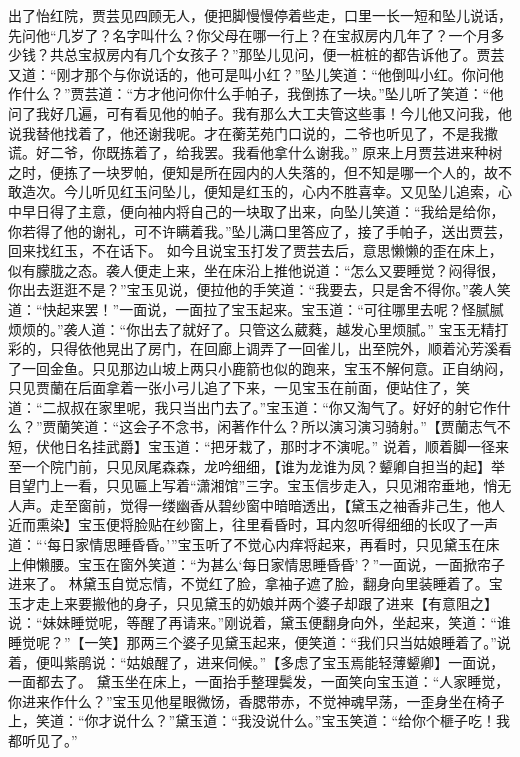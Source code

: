 \documentclass[12pt,oneside]{book}
\begin{document}
出了怡红院，贾芸见四顾无人，便把脚慢慢停着些走，口里一长一短和坠儿说话，先问他“几岁了？名字叫什么？你父母在哪一行上？在宝叔房内几年了？一个月多少钱？共总宝叔房内有几个女孩子？”那坠儿见问，便一桩桩的都告诉他了。贾芸又道：“刚才那个与你说话的，他可是叫小红？”坠儿笑道：“他倒叫小红。你问他作什么？”贾芸道：“方才他问你什么手帕子，我倒拣了一块。”坠儿听了笑道：“他问了我好几遍，可有看见他的帕子。我有那么大工夫管这些事！今儿他又问我，他说我替他找着了，他还谢我呢。才在蘅芜苑门口说的，二爷也听见了，不是我撒谎。好二爷，你既拣着了，给我罢。我看他拿什么谢我。”
原来上月贾芸进来种树之时，便拣了一块罗帕，便知是所在园内的人失落的，但不知是哪一个人的，故不敢造次。今儿听见红玉问坠儿，便知是红玉的，心内不胜喜幸。又见坠儿追索，心中早日得了主意，便向袖内将自己的一块取了出来，向坠儿笑道：“我给是给你，你若得了他的谢礼，可不许瞒着我。”坠儿满口里答应了，接了手帕子，送出贾芸，回来找红玉，不在话下。
如今且说宝玉打发了贾芸去后，意思懒懒的歪在床上，似有朦胧之态。袭人便走上来，坐在床沿上推他说道：“怎么又要睡觉？闷得很，你出去逛逛不是？”宝玉见说，便拉他的手笑道：“我要去，只是舍不得你。”袭人笑道：“快起来罢！”一面说，一面拉了宝玉起来。宝玉道：“可往哪里去呢？怪腻腻烦烦的。”袭人道：“你出去了就好了。只管这么葳蕤，越发心里烦腻。”
宝玉无精打彩的，只得依他晃出了房门，在回廊上调弄了一回雀儿，出至院外，顺着沁芳溪看了一回金鱼。只见那边山坡上两只小鹿箭也似的跑来，宝玉不解何意。正自纳闷，只见贾蘭在后面拿着一张小弓儿追了下来，一见宝玉在前面，便站住了，笑道：“二叔叔在家里呢，我只当出门去了。”宝玉道：“你又淘气了。好好的射它作什么？”贾蘭笑道：“这会子不念书，闲著作什么？所以演习演习骑射。”【贾蘭志气不短，伏他日名挂武爵】宝玉道：“把牙栽了，那时才不演呢。”
说着，顺着脚一径来至一个院门前，只见凤尾森森，龙吟细细，【谁为龙谁为凤？颦卿自担当的起】举目望门上一看，只见匾上写着“潇湘馆”三字。宝玉信步走入，只见湘帘垂地，悄无人声。走至窗前，觉得一缕幽香从碧纱窗中暗暗透出，【黛玉之袖香非己生，他人近而熏染】宝玉便将脸贴在纱窗上，往里看昏时，耳内忽听得细细的长叹了一声道：“‘每日家情思睡昏昏。’”宝玉听了不觉心内痒将起来，再看时，只见黛玉在床上伸懒腰。宝玉在窗外笑道：“为甚么‘每日家情思睡昏昏’？”一面说，一面掀帘子进来了。
林黛玉自觉忘情，不觉红了脸，拿袖子遮了脸，翻身向里装睡着了。宝玉才走上来要搬他的身子，只见黛玉的奶娘并两个婆子却跟了进来【有意阻之】说：“妹妹睡觉呢，等醒了再请来。”刚说着，黛玉便翻身向外，坐起来，笑道：“谁睡觉呢？”【一笑】那两三个婆子见黛玉起来，便笑道：“我们只当姑娘睡着了。”说着，便叫紫鹃说：“姑娘醒了，进来伺候。”【多虑了宝玉焉能轻薄颦卿】一面说，一面都去了。
黛玉坐在床上，一面抬手整理鬓发，一面笑向宝玉道：“人家睡觉，你进来作什么？”宝玉见他星眼微饧，香腮带赤，不觉神魂早荡，一歪身坐在椅子上，笑道：“你才说什么？”黛玉道：“我没说什么。”宝玉笑道：“给你个榧子吃！我都听见了。”
\end{document}

